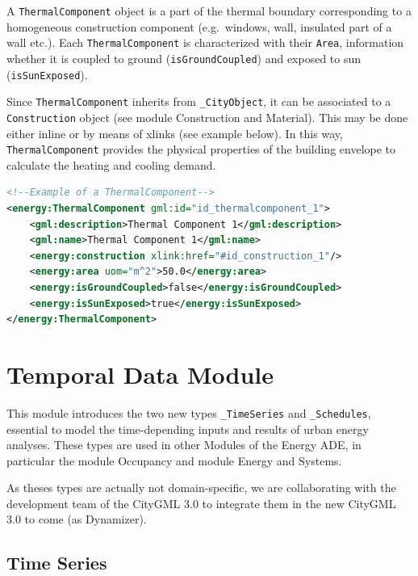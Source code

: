 \documentclass[a4paper,12pt]{article}
\let\stdsection\section%
\renewcommand\section{\newpage\stdsection}
\begin{document}
A \lstinline!ThermalComponent! object is a part of the thermal boundary
corresponding to a homogeneous construction component (e.g.~windows,
wall, insulated part of a wall etc.). Each \lstinline!ThermalComponent!
is characterized with their \lstinline!Area!, information whether it is
coupled to ground (\lstinline!isGroundCoupled!) and exposed to sun
(\lstinline!isSunExposed!).

Since \lstinline!ThermalComponent! inherits from
\lstinline!_CityObject!, it can be associated to a
\lstinline!Construction! object (see module Construction and Material).
This may be done either inline or by means of xlinks (see example
below). In this way, \lstinline!ThermalComponent! provides the physical
properties of the building envelope to calculate the heating and cooling
demand.

\begin{lstlisting}[language=XML]
<!--Example of a ThermalComponent-->
<energy:ThermalComponent gml:id="id_thermalcomponent_1">
    <gml:description>Thermal Component 1</gml:description>
    <gml:name>Thermal Component 1</gml:name>
    <energy:construction xlink:href="#id_construction_1"/>
    <energy:area uom="m^2">50.0</energy:area>
    <energy:isGroundCoupled>false</energy:isGroundCoupled>
    <energy:isSunExposed>true</energy:isSunExposed>
</energy:ThermalComponent>
\end{lstlisting}

\section{Temporal Data Module}\label{temporal-data-module}

This module introduces the two new types \lstinline!_TimeSeries! and
\lstinline!_Schedules!, essential to model the time-depending inputs and
results of urban energy analyses. These types are used in other Modules
of the Energy ADE, in particular the module Occupancy and module Energy
and Systems.

As theses types are actually not domain-specific, we are collaborating
with the development team of the CityGML 3.0 to integrate them in the
new CityGML 3.0 to come (as Dynamizer).

\subsection{Time Series}\label{time-series}
\end{document}
